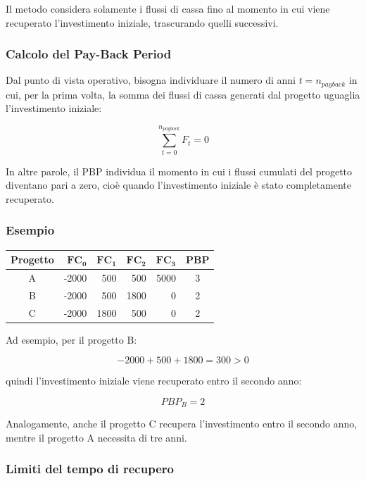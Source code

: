 \noindent Il metodo considera solamente i flussi di cassa fino al momento in cui viene recuperato 
l'investimento iniziale, trascurando quelli successivi.

\subsubsection*{Calcolo del Pay-Back Period}

\noindent Dal punto di vista operativo, bisogna individuare il numero di 
anni $t=n_{payback}$ in cui, per la prima volta, la somma dei flussi di cassa generati dal progetto uguaglia l'investimento iniziale:

\[
\boxed{
\sum_{t=0}^{n_{payback}} F_t = 0
}
\]

\noindent In altre parole, il PBP individua il momento in cui i flussi cumulati del progetto diventano 
pari a zero, cioè quando l'investimento iniziale è stato completamente recuperato.

\subsubsection*{Esempio}

\begin{center}
\begin{tabular}{|c|rrrr|c|}
\hline
\textbf{Progetto} & $\mathbf{FC_0}$ & $\mathbf{FC_1}$ & $\mathbf{FC_2}$ & $\mathbf{FC_3}$ & \textbf{PBP} \\
\hline
A & -2000 & 500  & 500  & 5000 & 3 \\
B & -2000 & 500  & 1800 & 0    & 2 \\
C & -2000 & 1800 & 500  & 0    & 2 \\
\hline
\end{tabular}
\end{center}

\noindent Ad esempio, per il progetto B:

\[
-2000 + 500 + 1800 = 300 > 0
\]

\noindent quindi l'investimento iniziale viene recuperato entro il secondo anno:

\[
\boxed{PBP_B = 2}
\]

\noindent Analogamente, anche il progetto C recupera l'investimento entro il secondo anno, 
mentre il progetto A necessita di tre anni.

\subsubsection*{Limiti del tempo di recupero}

